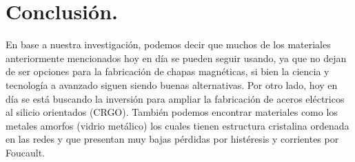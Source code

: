\documentclass[12pt,a4paper]{article}
\begin{document}
\section{Conclusión.}

En base a nuestra investigación, podemos decir que muchos de los materiales anteriormente mencionados hoy en día se pueden seguir usando, ya que no dejan de ser opciones para la fabricación de chapas magnéticas, si bien la ciencia y tecnología a avanzado siguen siendo buenas alternativas. Por otro lado, hoy en día se está buscando la inversión para ampliar la fabricación de aceros eléctricos al silicio orientados (CRGO). También podemos encontrar materiales como los metales amorfos (vidrio metálico) los cuales tienen estructura cristalina ordenada en las redes y que presentan muy bajas pérdidas por histéresis y corrientes por Foucault.
\end{document}
